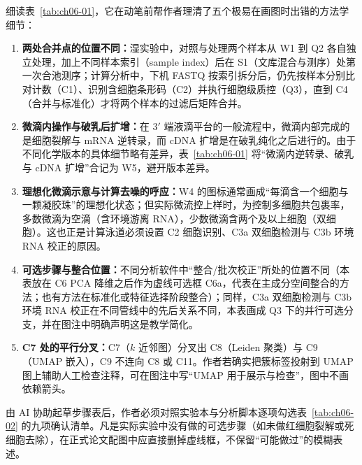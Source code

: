 细读表~\ref{tab:ch06-01}，它在动笔前帮作者理清了五个极易在画图时出错的方法学细节：
\begin{enumerate}
\item \textbf{两处合并点的位置不同：}湿实验中，对照与处理两个样本从 W1 到 Q2 各自独立处理，加上不同样本索引（sample index）后在 S1（文库混合与测序）处第一次合池测序；计算分析中，下机 FASTQ 按索引拆分后，仍先按样本分别比对计数（C1）、识别含细胞条形码（C2）并执行细胞级质控（Q3），直到 C4（合并与标准化）才将两个样本的过滤后矩阵合并。
\item \textbf{微滴内操作与破乳后扩增：}在 3$'$ 端液滴平台的一般流程中，微滴内部完成的是细胞裂解与 mRNA 逆转录，而 cDNA 扩增是在破乳纯化之后进行的。由于不同化学版本的具体细节略有差异，表~\ref{tab:ch06-01} 将“微滴内逆转录、破乳与 cDNA 扩增”合记为 W5，避开版本差异。
\item \textbf{理想化微滴示意与计算去噪的呼应：}W4 的图标通常画成“每滴含一个细胞与一颗凝胶珠”的理想化状态；但实际微流控上样时，为控制多细胞共包裹率，多数微滴为空滴（含环境游离 RNA），少数微滴含两个及以上细胞（双细胞）。这也正是计算泳道必须设置 C2 细胞识别、C3a 双细胞检测与 C3b 环境 RNA 校正的原因。
\item \textbf{可选步骤与整合位置：}不同分析软件中“整合/批次校正”所处的位置不同（本表放在 C6 PCA 降维之后作为虚线可选框 C6a，代表在主成分空间整合的方法；也有方法在标准化或特征选择阶段整合）；同样，C3a 双细胞检测与 C3b 环境 RNA 校正在不同管线中的先后关系不同，本表画成 Q3 下的并行可选分支，并在图注中明确声明这是教学简化。
\item \textbf{C7 处的平行分叉：}C7（$k$ 近邻图）分叉出 C8（Leiden 聚类）与 C9（UMAP 嵌入），C9 不连向 C8 或 C11。作者若确实把簇标签投射到 UMAP 图上辅助人工检查注释，可在图注中写“UMAP 用于展示与检查”，图中不画依赖箭头。
\end{enumerate}

由 AI 协助起草步骤表后，作者必须对照实验本与分析脚本逐项勾选表~\ref{tab:ch06-02} 的九项确认清单。凡是实际实验中没有做的可选步骤（如未做红细胞裂解或死细胞去除），在正式论文配图中应直接删掉虚线框，不保留“可能做过”的模糊表述。

